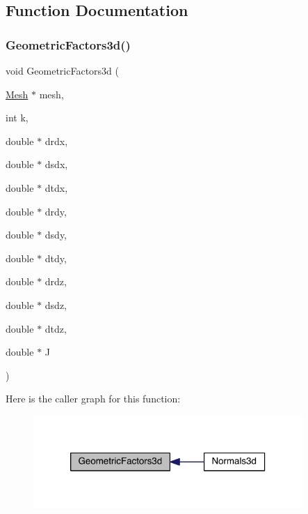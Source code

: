 \subsection{Function Documentation}
\mbox{\label{a00590_a962817a1e01d941ede2d0a7e31f136d7}} 
\subsubsection{\texorpdfstring{Geometric\+Factors3d()}{GeometricFactors3d()}}
{\footnotesize\ttfamily void Geometric\+Factors3d (\begin{DoxyParamCaption}\item[{\hyperlink{a00557_aeffbe0891ab73a4d8964c9cb7978426e}{Mesh} $\ast$}]{mesh,  }\item[{int}]{k,  }\item[{double $\ast$}]{drdx,  }\item[{double $\ast$}]{dsdx,  }\item[{double $\ast$}]{dtdx,  }\item[{double $\ast$}]{drdy,  }\item[{double $\ast$}]{dsdy,  }\item[{double $\ast$}]{dtdy,  }\item[{double $\ast$}]{drdz,  }\item[{double $\ast$}]{dsdz,  }\item[{double $\ast$}]{dtdz,  }\item[{double $\ast$}]{J }\end{DoxyParamCaption})}

Here is the caller graph for this function\+:\nopagebreak
\begin{figure}[H]
\begin{center}
\leavevmode
\includegraphics[width=290pt]{a00590_a962817a1e01d941ede2d0a7e31f136d7_icgraph}
\end{center}
\end{figure}
\mbox{\label{a00590_a7dad59f4c5add70012ffb84d688ce948}} 
